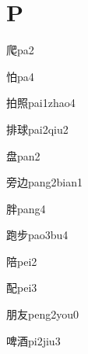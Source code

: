 ﻿%
\section*{P}

\begin{verbete}[8]{爬}{pa2}
\end{verbete}

\begin{verbete}[8]{怕}{pa4}
\end{verbete}

\begin{verbete}[8;13]{拍照}{pai1zhao4}
\end{verbete}

\begin{verbete}[11;11]{排球}{pai2qiu2}
\end{verbete}

\begin{verbete}[11]{盘}{pan2}
\end{verbete}

\begin{verbete}[10;5]{旁边}{pang2bian1}
\end{verbete}

\begin{verbete}[9]{胖}{pang4}
\end{verbete}

\begin{verbete}[12;7]{跑步}{pao3bu4}
\end{verbete}

\begin{verbete}[10]{陪}{pei2}
\end{verbete}

\begin{verbete}[10]{配}{pei3}
\end{verbete}

\begin{verbete}[8;4]{朋友}{peng2you0}
\end{verbete}

\begin{verbete}[11;10]{啤酒}{pi2jiu3}
\end{verbete}

